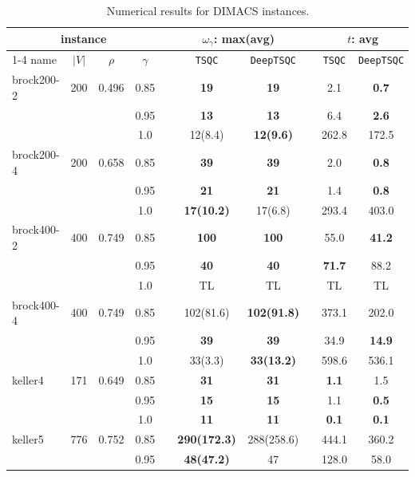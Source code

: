 \begin{table}[h!]
    \footnotesize
    \caption{Numerical results for DIMACS instances.}
    \label{tab: dimacs}
    \centering
    \begin{tabular}{l c c c c c c c c c}
    \toprule
    \toprule
    \multicolumn{4}{c}{instance} & & \multicolumn{2}{c}{$\omega_{\gamma}$: max(avg)} & &
    \multicolumn{2}{c}{$t$: avg} \\
    \cmidrule{1-4} \cmidrule{6-7} \cmidrule{9-10}
    name & $|V|$ & $\rho$ & $\gamma$ & & \texttt{TSQC} & \texttt{DeepTSQC} & & \texttt{TSQC} & \texttt{DeepTSQC} \\
    \midrule
brock200-2 & 200 & 0.496 & 0.85 & & \textbf{19} & \textbf{19} & & 2.1 & \textbf{0.7} \\
& & & 0.95 & & \textbf{13} & \textbf{13} & & 6.4 & \textbf{2.6} \\
& & & 1.0 & & 12(8.4) & \textbf{12(9.6)} & & 262.8 & 172.5 \\
\midrule
brock200-4 & 200 & 0.658 & 0.85 & & \textbf{39} & \textbf{39} & & 2.0 & \textbf{0.8} \\
& & & 0.95 & & \textbf{21} & \textbf{21} & & 1.4 & \textbf{0.8} \\
& & & 1.0 & & \textbf{17(10.2)} & 17(6.8) & & 293.4 & 403.0 \\
\midrule
brock400-2 & 400 & 0.749 & 0.85 & & \textbf{100} & \textbf{100} & & 55.0 & \textbf{41.2} \\
& & & 0.95 & & \textbf{40} & \textbf{40} & & \textbf{71.7} & 88.2 \\
& & & 1.0 & & TL & TL & & TL & TL \\
\midrule
brock400-4 & 400 & 0.749 & 0.85 & & 102(81.6) & \textbf{102(91.8)} & & 373.1 & 202.0 \\
& & & 0.95 & & \textbf{39} & \textbf{39} & & 34.9 & \textbf{14.9} \\
& & & 1.0 & & 33(3.3) & \textbf{33(13.2)} & & 598.6 & 536.1 \\
\midrule
keller4 & 171 & 0.649 & 0.85 & & \textbf{31} & \textbf{31} & & \textbf{1.1} & 1.5 \\
& & & 0.95 & & \textbf{15} & \textbf{15} & & 1.1 & \textbf{0.5} \\
& & & 1.0 & & \textbf{11} & \textbf{11} & & \textbf{0.1} & \textbf{0.1} \\
\midrule
keller5 & 776 & 0.752 & 0.85 & & \textbf{290(172.3)} & 288(258.6) & & 444.1 & 360.2 \\
& & & 0.95 & & \textbf{48(47.2)} & 47 & & 128.0 & 58.0 \\

\end{tabular}
\end{table}
